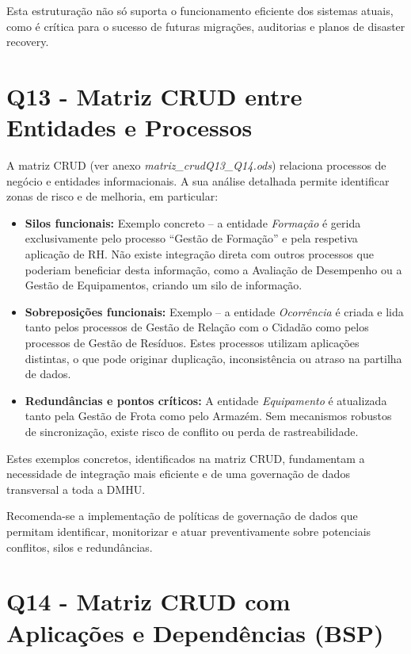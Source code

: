 \documentclass[12pt,a4paper,final]{article}
\begin{document}
    Esta estruturação não só suporta o funcionamento eficiente dos sistemas atuais, como é crítica para o sucesso de futuras migrações, auditorias e planos de disaster recovery.

    \section*{Q13 - Matriz CRUD entre Entidades e Processos}

    A matriz CRUD (ver anexo \textit{matriz\_crudQ13\_Q14.ods}) relaciona processos de negócio e entidades
    informacionais. A sua análise detalhada permite identificar zonas de risco e de melhoria, em particular:

    \begin{itemize}
        \item \textbf{Silos funcionais:} Exemplo concreto – a entidade \textit{Formação} é gerida exclusivamente pelo processo “Gestão de Formação” e pela respetiva aplicação de RH. Não existe integração direta com outros processos que poderiam beneficiar desta informação, como a Avaliação de Desempenho ou a Gestão de Equipamentos, criando um silo de informação.
        \item \textbf{Sobreposições funcionais:} Exemplo – a entidade \textit{Ocorrência} é criada e lida tanto pelos processos de Gestão de Relação com o Cidadão como pelos processos de Gestão de Resíduos. Estes processos utilizam aplicações distintas, o que pode originar duplicação, inconsistência ou atraso na partilha de dados.
        \item \textbf{Redundâncias e pontos críticos:} A entidade \textit{Equipamento} é atualizada tanto pela Gestão de Frota como pelo Armazém. Sem mecanismos robustos de sincronização, existe risco de conflito ou perda de rastreabilidade.
    \end{itemize}

    Estes exemplos concretos, identificados na matriz CRUD, fundamentam a necessidade de integração mais eficiente e de uma governação de dados transversal a toda a DMHU.

    Recomenda-se a implementação de políticas de governação de dados que permitam identificar, monitorizar e atuar preventivamente sobre potenciais conflitos, silos e redundâncias.

    \section*{Q14 - Matriz CRUD com Aplicações e Dependências (BSP)}
\end{document}
